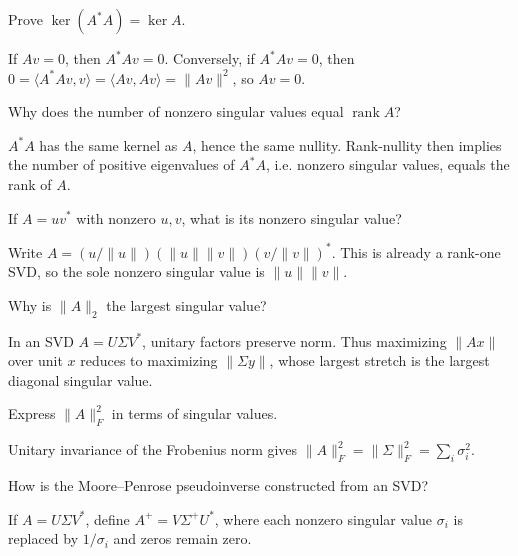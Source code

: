 \begin{problem}\label{prob:i18-problem-02}
Prove $\ker(A^*A)=\ker A$.
\end{problem}
\begin{solution}
If $Av=0$, then $A^*Av=0$. Conversely, if $A^*Av=0$, then $0=\langle A^*Av,v\rangle=\langle Av,Av\rangle=\|Av\|^2$, so $Av=0$.
\end{solution}

\begin{problem}\label{prob:i18-problem-03}
Why does the number of nonzero singular values equal $\operatorname{rank}A$?
\end{problem}
\begin{solution}
$A^*A$ has the same kernel as $A$, hence the same nullity. Rank-nullity then implies the number of positive eigenvalues of $A^*A$, i.e. nonzero singular values, equals the rank of $A$.
\end{solution}

\begin{problem}\label{prob:i18-problem-04}
If $A=uv^*$ with nonzero $u,v$, what is its nonzero singular value?
\end{problem}
\begin{solution}
Write $A=(u/\|u\|)(\|u\|\|v\|)(v/\|v\|)^*$. This is already a rank-one SVD, so the sole nonzero singular value is $\|u\|\|v\|$.
\end{solution}

\begin{problem}\label{prob:i18-problem-05}
Why is $\|A\|_2$ the largest singular value?
\end{problem}
\begin{solution}
In an SVD $A=U\Sigma V^*$, unitary factors preserve norm. Thus maximizing $\|Ax\|$ over unit $x$ reduces to maximizing $\|\Sigma y\|$, whose largest stretch is the largest diagonal singular value.
\end{solution}

\begin{problem}\label{prob:i18-problem-06}
Express $\|A\|_F^2$ in terms of singular values.
\end{problem}
\begin{solution}
Unitary invariance of the Frobenius norm gives $\|A\|_F^2=\|\Sigma\|_F^2=\sum_i\sigma_i^2$.
\end{solution}

\begin{problem}[Pseudoinverse]\label{prob:i18-problem-07}
How is the Moore–Penrose pseudoinverse constructed from an SVD?
\end{problem}
\begin{solution}
If $A=U\Sigma V^*$, define $A^+=V\Sigma^+U^*$, where each nonzero singular value $\sigma_i$ is replaced by $1/\sigma_i$ and zeros remain zero.
\end{solution}


